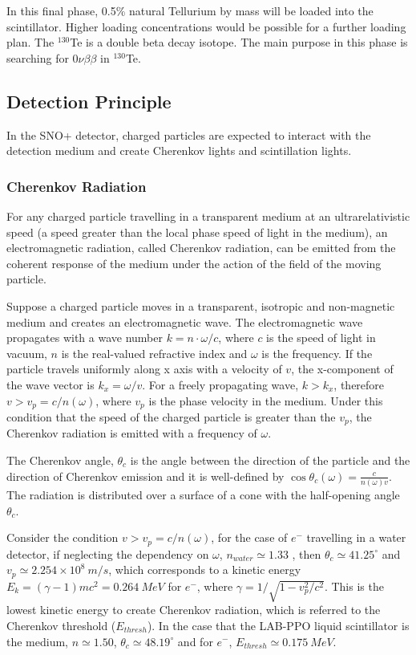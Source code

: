 In this final phase, 0.5\% natural Tellurium by mass will be loaded into the scintillator.
Higher loading concentrations would be possible for a further loading plan\cite{Paton:2019kgy}.
 The $^{130}$Te is a double beta decay isotope. The main purpose in this phase is searching for $0\nu\beta\beta$ in $^{130}$Te.


\subsection{Detection Principle}
In the SNO+ detector, charged particles are expected to interact with the detection medium and create Cherenkov lights and scintillation lights. 


\subsubsection{Cherenkov Radiation}
For any charged particle travelling in a transparent medium at an ultrarelativistic speed (a speed greater than the local phase speed of light in the medium), an electromagnetic radiation, called Cherenkov radiation, can be emitted from the coherent response of the medium under the action of the field of the moving particle\cite{jackson2007classical,landau2013electrodynamics}.

Suppose a charged particle moves in a transparent, isotropic and non-magnetic medium and creates an electromagnetic wave. The electromagnetic wave propagates with a wave number $k=n\cdot\omega/c$, where $c$ is the speed of light in vacuum, $n$ is the real-valued refractive index and $\omega$ is the frequency. If the particle travels uniformly along x axis with a velocity of $v$, the x-component of the wave vector is $k_x=\omega/v$. For a freely propagating wave, $k>k_x$, therefore $v>v_p=c/n(\omega)$, where $v_p$ is the phase velocity in the medium. Under this condition that the speed of the charged particle is greater than the $v_p$, the Cherenkov radiation is emitted with a frequency of $\omega$\cite{landau2013electrodynamics}.   

The Cherenkov angle, $\theta_c$ is the angle between the direction of the particle and the direction of Cherenkov emission and it is well-defined by $\cos\theta_c(\omega) = \frac{c}{n(\omega)v}$. The radiation is distributed over a surface of a cone with the half-opening angle $\theta_c$. 

Consider the condition $v>v_p=c/n(\omega)$, for the case of $e^-$ travelling in a water detector, if neglecting the dependency on $\omega$, $n_{water}\simeq 1.33$ \cite{pdg2018}, then $\theta_c\simeq 41.25^\circ$ and $v_p\simeq 2.254\times10^8~m/s$, which corresponds to a kinetic energy $E_k=(\gamma-1)mc^2=0.264~MeV$ for $e^-$, where $\gamma=1/\sqrt{1-v_p^2/c^2}$. This is the lowest kinetic energy to create Cherenkov radiation, which is referred to the Cherenkov threshold ($E_{thresh}$). In the case that the LAB-PPO liquid scintillator is the medium, $n\simeq 1.50$\cite{tseung2011ellipsometric}, $\theta_c\simeq 48.19^\circ$ and for $e^-$, $E_{thresh}\simeq 0.175~MeV$.   

